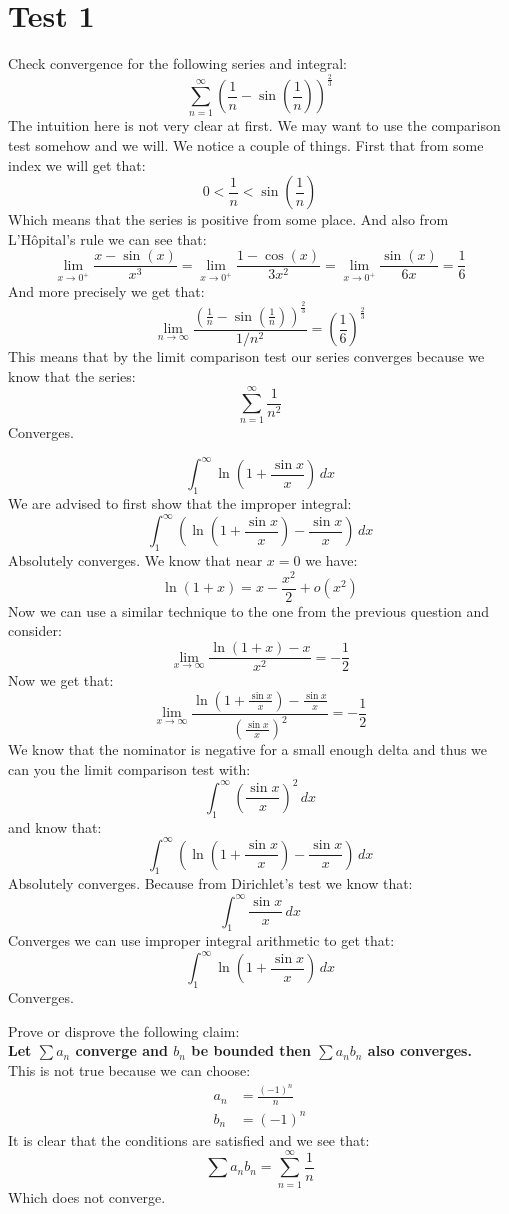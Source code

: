\documentclass{article}
\theoremstyle{plain}
\begin{document}
	\section{Test 1}
	Check convergence for the following series and integral:
	\[
		\sum_{n=1}^{\infty}
		{\left(\frac{1}{n} - \sin\left(\frac{1}{n}\right)\right)}^{\frac 23}
	\]
	The intuition here is not very clear at first. We may want to use
	the comparison test somehow and we will. We notice a couple of things.
	First that from some index we will get that:
	\[
		0 < \frac{1}{n} < \sin\left(\frac{1}{n}\right)
	\]
	Which means that the series is positive from some place. And also
	from L'H\^opital's rule we can see that:
	\[
		\lim_{x\to0^+}{\frac{x - \sin(x)}{x^3}} = 
		\lim_{x\to0^+}{\frac{1 - \cos(x)}{3x^2}} = 
		\lim_{x\to0^+}{\frac{\sin(x)}{6x}} = \frac{1}{6}
	\]
	And more precisely we get that:
	\[
		\lim_{n\to\infty}
		{\frac{(\frac{1}{n} - \sin\left(\frac{1}{n}\right))
		^{\frac{2}{3}}}{1/n^2}} = \left(\frac{1}{6}\right)^{\frac{2}{3}}
	\]
	This means that by the limit comparison test our series converges
	because we know that the series:
	\[
		\sum_{n=1}^{\infty}{\frac{1}{n^2}}
	\]
	Converges.
	
	\newpage
	
	\[
		\int_{1}^{\infty}{\ln\left(1+\frac{\sin x}{x}\right)\,dx}
	\]
	We are advised to first show that the improper integral:
	\[
		\int_{1}^{\infty}{\left(\ln\left(1+\frac{\sin x}{x}\right)
		- \frac{\sin x}{x}\right)\,dx}
	\]
	Absolutely converges. We know that near $x = 0$ we have:
	\[
		\ln(1+x) = x - \frac{x^2}{2} + o(x^2)
	\]
	Now we can use a similar technique to the one from the previous question
	and consider:
	\[
		\lim_{x\to\infty}{\frac{\ln(1+x) - x}{x^2}} = -\frac 12
	\]
	Now we get that:
	\[
		\lim_{x\to\infty}
		{\frac{\ln(1+\frac{\sin x}{x}) - \frac{\sin x}{x}}
		{(\frac{\sin x}{x})^2}} 
		= -\frac 12
	\]
	We know that the nominator is negative for a small enough delta
	and thus we can you the limit comparison test with:
	\[
		\int_{1}^{\infty}{\left(\frac{\sin x}{x}\right)^2\,dx}
	\]
	and know that:
	\[
		\int_{1}^{\infty}{\left(\ln\left(1+\frac{\sin x}{x}\right)
		- \frac{\sin x}{x}\right)\,dx}
	\]
	Absolutely converges. Because from Dirichlet's test we know that:
	\[
		\int_{1}^{\infty}{\frac{\sin x}{x}\,dx}
	\]
	Converges we can use improper integral arithmetic to get that:
	\[
		\int_{1}^{\infty}{\ln\left(1+\frac{\sin x}{x}\right)\,dx}
	\]
	Converges.
	
	\newpage
	
	Prove or disprove the following claim: \\
	\textbf{Let $\sum{a_n}$ converge and $b_n$ be bounded then 
	$\sum{a_n b_n}$ also converges.} \\
	This is not true because we can choose:
	\begin{align*}
		a_n &= \frac{(-1)^n}{n} \\
		b_n &= (-1)^n
	\end{align*}
	It is clear that the conditions are satisfied and we see that:
	\[
		\sum{a_n b_n} = \sum_{n=1}^{\infty}{\frac{1}{n}}
	\]
	Which does not converge.
	
\end{document}
